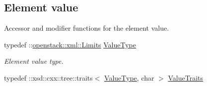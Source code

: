 \subsection*{Element value}
\label{_amgrp2ee2eae1a8c390ea033f241c027da8d6}
Accessor and modifier functions for the element value. \begin{DoxyCompactItemize}
\item 
\hypertarget{classopenstack_1_1xml_1_1Limits___ad0340defbe302c712e6f2a0ea438ede8}{
typedef ::\hyperlink{classopenstack_1_1xml_1_1Limits}{openstack::xml::Limits} \hyperlink{classopenstack_1_1xml_1_1Limits___ad0340defbe302c712e6f2a0ea438ede8}{ValueType}}
\label{classopenstack_1_1xml_1_1Limits___ad0340defbe302c712e6f2a0ea438ede8}

\begin{DoxyCompactList}\small\item\em Element value type. \item\end{DoxyCompactList}\item 
\hypertarget{classopenstack_1_1xml_1_1Limits___aff93c78e404d4d125e867f1ad65cb72f}{
typedef ::xsd::cxx::tree::traits$<$ \hyperlink{classopenstack_1_1xml_1_1Limits}{ValueType}, char $>$ \hyperlink{classopenstack_1_1xml_1_1Limits___aff93c78e404d4d125e867f1ad65cb72f}{ValueTraits}}
\label{classopenstack_1_1xml_1_1Limits___aff93c78e404d4d125e867f1ad65cb72f}


\end{DoxyCompactItemize}
